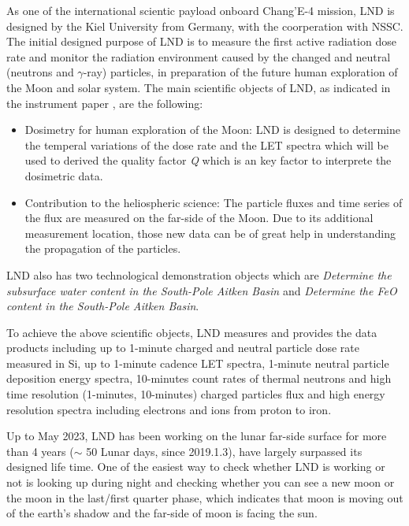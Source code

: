 As one of the international scientic payload onboard Chang'E-4 mission, \ac{LND} is designed by the Kiel University from Germany, with the coorperation with NSSC. The initial designed purpose of \ac{LND} is to measure the first active radiation dose rate and monitor the radiation environment caused by the changed and neutral (neutrons and $\gamma$-ray) particles, in preparation of the future human exploration of the Moon and solar system.
The main scientific objects of LND, as indicated in the instrument paper \citep{Wimmer-2020-LND}, are the following:
\begin{itemize}
    \item Dosimetry for human exploration of the Moon: LND is designed  to determine the temperal variations of the dose rate and the LET spectra which will be used to derived the quality factor \textit{Q} which is an key factor to interprete the dosimetric data.
    \item Contribution to the heliospheric science: The particle fluxes and time series of the flux are measured on the far-side of the Moon. Due to its additional measurement location, those new data can be of great help in understanding the propagation of the particles.
\end{itemize}
\ac{LND} also has two technological demonstration objects which are \textit{Determine the subsurface water content in the South-Pole Aitken Basin} and \textit{Determine the FeO content in the South-Pole Aitken Basin}.\citep{Wimmer-2020-LND}

To achieve the above scientific objects, LND measures and provides the data products including up to 1-minute charged and neutral particle dose rate measured in Si, up to 1-minute cadence LET spectra, 1-minute neutral particle deposition energy spectra, 10-minutes count rates of thermal neutrons and high time resolution (1-minutes, 10-minutes) charged particles flux and high energy resolution spectra including electrons and ions from proton to iron.

Up to May 2023, LND has been working on the lunar far-side surface for more than 4 years ($\sim$ 50 Lunar days, since 2019.1.3), have largely surpassed its designed life time.
One of the easiest way to check whether LND is working or not is looking up during night and checking whether you can see a new moon or the moon in the last/first quarter phase, which indicates that moon is moving out of the earth's shadow and the far-side of moon is facing the sun.

